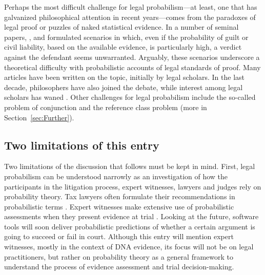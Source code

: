 \documentclass{article}
\begin{document}
Perhaps the most difficult  challenge for legal probabilism---at least, one that has galvanized philosophical attention in recent years---comes from the paradoxes of legal proof or puzzles of naked statistical evidence. In  a number of seminal papers, \cite{Nesson1979Reasonable-doub}, \cite{Cohen81} and \cite{Thomson86}  formulated  scenarios in which, even if the probability of guilt or civil liability, based on the available evidence, is particularly high, a verdict against the defendant seems unwarranted.  Arguably, these scenarios underscore a theoretical difficulty with probabilistic accounts of legal standards of proof. Many articles have been written on the topic, initially by legal scholars. In the last decade, philosophers have also joined the debate, while interest among legal scholars has waned \cite[for  critical surveys, see][and more references in Section~\ref{sec:naked}]{redmayne2008exploring,gardiner2018,pardo2019}.
Other challenges for legal probabilism include the so-called problem of conjunction and the reference class problem  (more in Section~\ref{sec:Further}).


\subsection{Two limitations of this entry}

Two limitations of the discussion 
that follows must be kept in mind. 
First, legal probabilism can be understood narrowly as an investigation of how the participants in the litigation process, expert witnesses, lawyers and judges rely on probability theory. Tax lawyers often formulate their recommendations in probabilistic terms \citep{field2017tax}. Expert witnesses make extensive use of probabilistic assessments when they present evidence at trial \citep{enfs2015}. Looking at the future, software tools will soon deliver probabilistic predictions of whether a certain argument is going to succeed or fail in court.  Although this entry will mention expert witnesses, mostly in the context of DNA evidence, its focus will not be on  legal practitioners, but rather on probability theory as a general framework to understand the process of evidence assessment and trial decision-making. 
\end{document}
